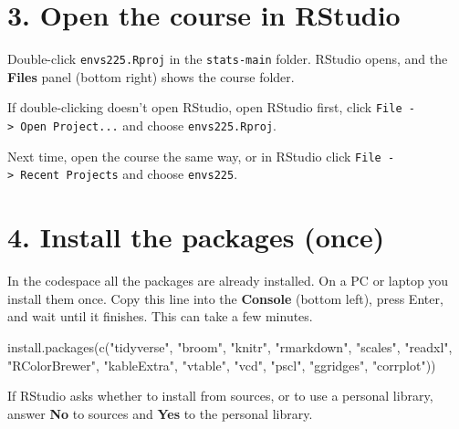 \documentclass[
  letterpaper,
  DIV=11,
  numbers=noendperiod]{scrreprt}
\newenvironment{Shaded}{\begin{snugshade}}{\end{snugshade}}
\newcommand{\FunctionTok}[1]{\textcolor[rgb]{0.28,0.35,0.67}{#1}}
\newcommand{\NormalTok}[1]{\textcolor[rgb]{0.00,0.23,0.31}{#1}}
\newcommand{\StringTok}[1]{\textcolor[rgb]{0.13,0.47,0.30}{#1}}
\begin{document}
\section*{3. Open the course in
RStudio}\label{open-the-course-in-rstudio}


Double-click \texttt{envs225.Rproj} in the \texttt{stats-main} folder.
RStudio opens, and the \textbf{Files} panel (bottom right) shows the
course folder.

If double-clicking doesn't open RStudio, open RStudio first, click
\texttt{File\ -\textgreater{}\ Open\ Project...} and choose
\texttt{envs225.Rproj}.

Next time, open the course the same way, or in RStudio click
\texttt{File\ -\textgreater{}\ Recent\ Projects} and choose
\texttt{envs225}.

\section*{4. Install the packages
(once)}\label{install-the-packages-once}


In the codespace all the packages are already installed. On a PC or
laptop you install them once. Copy this line into the \textbf{Console}
(bottom left), press Enter, and wait until it finishes. This can take a
few minutes.

\begin{Shaded}
\begin{Highlighting}[]
\FunctionTok{install.packages}\NormalTok{(}\FunctionTok{c}\NormalTok{(}\StringTok{"tidyverse"}\NormalTok{, }\StringTok{"broom"}\NormalTok{, }\StringTok{"knitr"}\NormalTok{, }\StringTok{"rmarkdown"}\NormalTok{, }\StringTok{"scales"}\NormalTok{, }\StringTok{"readxl"}\NormalTok{, }\StringTok{"RColorBrewer"}\NormalTok{, }\StringTok{"kableExtra"}\NormalTok{, }\StringTok{"vtable"}\NormalTok{, }\StringTok{"vcd"}\NormalTok{, }\StringTok{"pscl"}\NormalTok{, }\StringTok{"ggridges"}\NormalTok{, }\StringTok{"corrplot"}\NormalTok{))}
\end{Highlighting}
\end{Shaded}

If RStudio asks whether to install from sources, or to use a personal
library, answer \textbf{No} to sources and \textbf{Yes} to the personal
library.
\end{document}
